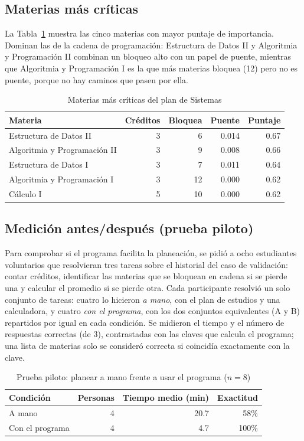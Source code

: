 \documentclass[11pt,a4paper]{article}
\begin{document}
\subsection{Materias más críticas}
La Tabla~\ref{tab:importancia} muestra las cinco materias con mayor puntaje de importancia. Dominan las de la cadena de programación: Estructura de Datos II y Algoritmia y Programación II combinan un bloqueo alto con un papel de puente, mientras que Algoritmia y Programación I es la que más materias bloquea (12) pero no es puente, porque no hay caminos que pasen por ella.

\begin{table}[htbp]
\centering
\caption{Materias más críticas del plan de Sistemas}
\label{tab:importancia}
\begin{tabular}{lrrrr}
\toprule
Materia & Créditos & Bloquea & Puente & Puntaje \\
\midrule
Estructura de Datos II & 3 & 6 & 0.014 & 0.67 \\
Algoritmia y Programación II & 3 & 9 & 0.008 & 0.66 \\
Estructura de Datos I & 3 & 7 & 0.011 & 0.64 \\
Algoritmia y Programación I & 3 & 12 & 0.000 & 0.62 \\
Cálculo I & 5 & 10 & 0.000 & 0.62 \\
\bottomrule
\end{tabular}
\end{table}

\subsection{Medición antes/después (prueba piloto)}
\label{sec:medicion}
Para comprobar si el programa facilita la planeación, se pidió a ocho estudiantes voluntarios que resolvieran tres tareas sobre el historial del caso de validación: contar créditos, identificar las materias que se bloquean en cadena si se pierde una y calcular el promedio si se pierde otra. Cada participante resolvió un solo conjunto de tareas: cuatro lo hicieron \emph{a mano}, con el plan de estudios y una calculadora, y cuatro \emph{con el programa}, con los dos conjuntos equivalentes (A y B) repartidos por igual en cada condición. Se midieron el tiempo y el número de respuestas correctas (de 3), contrastadas con las claves que calcula el programa; una lista de materias solo se consideró correcta si coincidía exactamente con la clave.

\begin{table}[htbp]\centering
\caption{Prueba piloto: planear a mano frente a usar el programa ($n=8$)}\label{tab:medicion}
\begin{tabular}{lrrr}\toprule
Condición & Personas & Tiempo medio (min) & Exactitud \\ \midrule
A mano & 4 & 20.7 & 58\% \\
Con el programa & 4 & 4.7 & 100\% \\
\bottomrule\end{tabular}\end{table}
\end{document}
